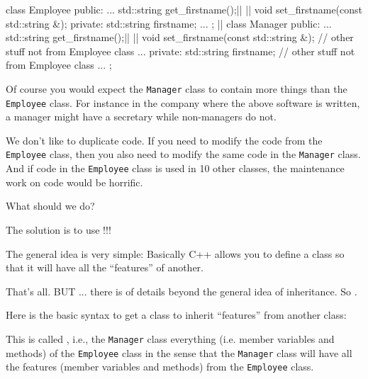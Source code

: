 \begin{consolethree}[escapeinside=||]
class Employee
{
public:
        ...
        std::string get_firstname();||                ||
        void set_firstname(const std::string &);
private:
        std::string firstname;
        ...
};
||
class Manager
{
public:
        ...
        std::string get_firstname();||                 ||
        void set_firstname(const std::string &);
        // other stuff not from Employee class
        ...
private:
        std::string firstname;
        // other stuff not from Employee class
        ...
}; 
\end{consolethree}
Of course you would expect the \texttt{Manager} class to contain more
things than the \texttt{Employee} class. For instance in the company where
the above software is written, a manager might have a secretary while
non-managers do not.

We don't like to duplicate code. If you need to modify the code from the
\texttt{Employee} class, then you also need to modify the same code in the
\texttt{Manager} class. And if code in the \texttt{Employee} class is used
in 10 other classes, the maintenance work on code would be horrific.

What should we do?

\newpage{}

The solution is to use !!!

The general idea is very simple: Basically C++ allows you to define a
class so that it will have all the ``features'' of another.

That's all. BUT ... there is  of details beyond the
general idea of inheritance. So .

Here is the basic syntax to get a class to inherit ``features'' from
another class:

This is called , i.e., the \texttt{Manager}
class  everything (i.e. member variables and methods)
of the \texttt{Employee} class in the sense that the \texttt{Manager} class
will have all the features (member variables and methods) from the
\texttt{Employee} class.

